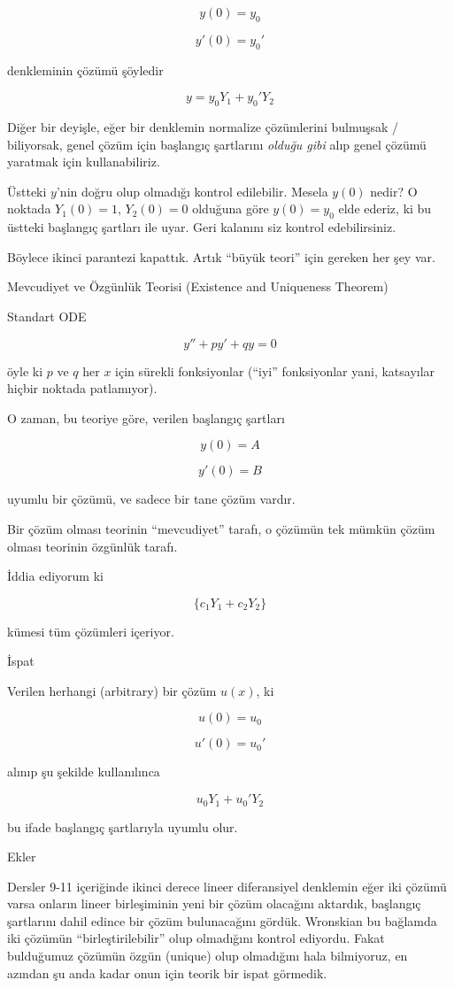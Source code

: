 \documentclass[12pt,fleqn]{article}\usepackage{../../common}
\begin{document}
$$ y(0) = y_0 $$

$$ y'(0) = y_0' $$

denkleminin çözümü şöyledir

$$ y = y_0 Y_1 + y_0' Y_2 $$

Diğer bir deyişle, eğer bir denklemin normalize çözümlerini bulmuşsak /
biliyorsak, genel çözüm için başlangıç şartlarını {\em olduğu gibi} alıp
genel çözümü yaratmak için kullanabiliriz. 

Üstteki $y$'nin doğru olup olmadığı kontrol edilebilir. Mesela $y(0)$
nedir? O noktada $Y_1(0)=1$, $Y_2(0)=0$ olduğuna göre  $y(0)=y_0$ elde
ederiz, ki bu üstteki başlangıç şartları ile uyar. Geri kalanını siz
kontrol edebilirsiniz. 

Böylece ikinci parantezi kapattık. Artık ``büyük teori'' için gereken her
şey var.

Mevcudiyet ve Özgünlük Teorisi (Existence and Uniqueness Theorem)

Standart ODE

$$ y'' + py' + qy = 0 $$

öyle ki $p$ ve $q$ her $x$ için sürekli fonksiyonlar (``iyi'' fonksiyonlar
yani, katsayılar hiçbir noktada patlamıyor). 

O zaman, bu teoriye göre, verilen başlangıç şartları

$$ y(0) = A $$

$$ y'(0) = B $$

uyumlu bir çözümü, ve sadece bir tane çözüm vardır. 

Bir çözüm olması teorinin ``mevcudiyet'' tarafı, o çözümün tek mümkün çözüm
olması teorinin özgünlük tarafı. 

İddia ediyorum ki 

$$ \bigg\{ c_1Y_1 + c_2Y_2 \bigg\} $$

kümesi tüm çözümleri içeriyor. 

İspat

Verilen herhangi (arbitrary) bir çözüm $u(x)$, ki

$$ u(0) = u_0 $$

$$ u'(0) = u_0' $$

alınıp şu şekilde kullanılınca

$$ u_0 Y_1 +  u_0'Y_2 $$

bu ifade başlangıç şartlarıyla uyumlu olur. 

Ekler

Dersler 9-11 içeriğinde ikinci derece lineer diferansiyel denklemin eğer iki
çözümü varsa onların lineer birleşiminin yeni bir çözüm olacağını aktardık,
başlangıç şartlarını dahil edince bir çözüm bulunacağını gördük. Wronskian bu
bağlamda iki çözümün ``birleştirilebilir'' olup olmadığını kontrol ediyordu.
Fakat bulduğumuz çözümün özgün (unique) olup olmadığını hala bilmiyoruz, en
azından şu anda kadar onun için teorik bir ispat görmedik.
\end{document}
